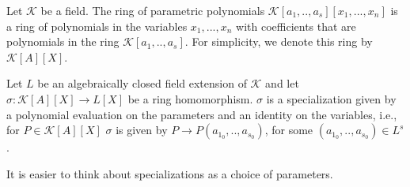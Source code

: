 \documentclass[runningheads]{llncs}
\newcommand{\Rr}{\mathbb{R}}
\newcommand{\1}{\chi}
\begin{document}


\begin{definition}
    Let $\mathcal{K}$ be a field. The ring of parametric polynomials
    $\mathcal{K}[a_1,..,a_s][x_1,...,x_n]$ is a ring of polynomials in the variables $x_1,...,x_n$ with coefficients that are polynomials
    in the ring $\mathcal{K}[a_1,..,a_s]$. 
    For simplicity, we denote this ring by $\mathcal{K}[A][X]$.
\end{definition}

\begin{definition}
    Let $L$ be an algebraically closed field extension of $\mathcal{K}$ and let $\sigma:\mathcal{K}[A][X]\rightarrow L[X]$ be a ring homomorphism. $\sigma$ is a specialization given by a polynomial evaluation on the parameters and an identity on the variables, i.e., 
    for $P\in \mathcal{K}[A][X]$
    $\sigma$ is given by $P\rightarrow P(a_{1_0},..,a_{s_0})$, for some $(a_{1_0},..,a_{s_0})\in L^s$.
    
\end{definition}
It is easier to think about specializations as a choice of parameters. \\
\end{document}
